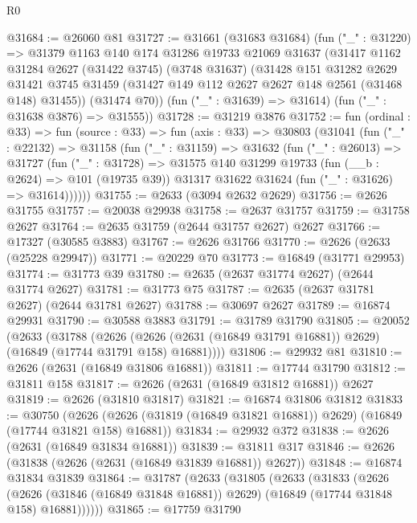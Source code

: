 \begin{lexlean}{R0}
\begin{coremodule}
@31684 := @26060 @81
@31727 := @31661
    (@31683 @31684)
    (fun ("_" : @31220) =>
    @31379
      @1163
      @140
      @174
      @31286
      @19733
      @21069
      @31637
      (@31417
        @1162
        @31284
        @2627
        (@31422 @3745)
        (@3748 @31637)
        (@31428
          @151
          @31282
          @2629
          @31421
          @3745
          @31459
          (@31427 @149 @112 @2627 @2627 @148 @2561 (@31468 @148) @31455))
        (@31474 @70))
      (fun ("_" : @31639) => @31614)
      (fun ("_" : @31638 @3876) => @31555))
@31728 := @31219 @3876
@31752 := fun (ordinal : @33) =>
  fun (source : @33) =>
  fun (axis : @33) =>
  @30803
    (@31041
      (fun ("_" : @22132) =>
      @31158
        (fun ("_" : @31159) =>
        @31632
          (fun ("_" : @26013) =>
          @31727
            (fun ("_" : @31728) =>
            @31575
              @140
              @31299
              @19733
              (fun (__b : @2624) => @101 (@19735 @39))
              @31317
              @31622
              @31624
              (fun ("_" : @31626) => @31614))))))
@31755 := @2633 (@3094 @2632 @2629)
@31756 := @2626 @31755
@31757 := @20038 @29938
@31758 := @2637 @31757
@31759 := @31758 @2627
@31764 := @2635 @31759 (@2644 @31757 @2627) @2627
@31766 := @17327 (@30585 @3883)
@31767 := @2626 @31766
@31770 := @2626 (@2633 (@25228 @29947))
@31771 := @20229 @70
@31773 := @16849 (@31771 @29953)
@31774 := @31773 @39
@31780 := @2635 (@2637 @31774 @2627) (@2644 @31774 @2627)
@31781 := @31773 @75
@31787 := @2635 (@2637 @31781 @2627) (@2644 @31781 @2627)
@31788 := @30697 @2627
@31789 := @16874 @29931
@31790 := @30588 @3883
@31791 := @31789 @31790
@31805 := @20052
    (@2633
      (@31788
        (@2626 (@2626 (@2631 (@16849 @31791 @16881)) @2629) (@16849 (@17744 @31791 @158) @16881))))
@31806 := @29932 @81
@31810 := @2626 (@2631 (@16849 @31806 @16881))
@31811 := @17744 @31790
@31812 := @31811 @158
@31817 := @2626 (@2631 (@16849 @31812 @16881)) @2627
@31819 := @2626 (@31810 @31817)
@31821 := @16874 @31806 @31812
@31833 := @30750
    (@2626 (@2626 (@31819 (@16849 @31821 @16881)) @2629) (@16849 (@17744 @31821 @158) @16881))
@31834 := @29932 @372
@31838 := @2626 (@2631 (@16849 @31834 @16881))
@31839 := @31811 @317
@31846 := @2626 (@31838 (@2626 (@2631 (@16849 @31839 @16881)) @2627))
@31848 := @16874 @31834 @31839
@31864 := @31787
    (@2633
      (@31805
        (@2633
          (@31833
            (@2626
              (@2626 (@31846 (@16849 @31848 @16881)) @2629)
              (@16849 (@17744 @31848 @158) @16881))))))
@31865 := @17759 @31790

\end{coremodule}
\end{lexlean}
